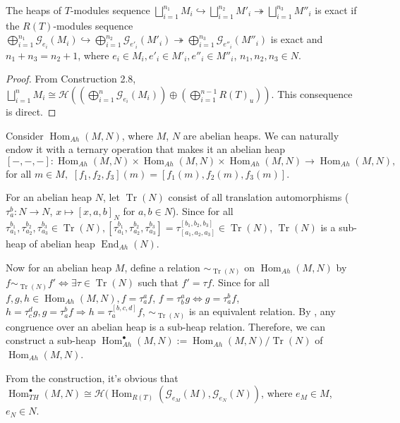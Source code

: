 \documentclass[11pt, twoside]{article}
\begin{document}
\begin{proposition}
The heaps of $T$-modules sequence $\bigsqcup_{i=1}^{n_1}M_i\hookrightarrow \bigsqcup_{i=1}^{n_2}M'_i \twoheadrightarrow \bigsqcup_{i=1}^{n_3}M''_i$ is exact if the $R(T)$-modules sequence $\bigoplus_{i=1}^{n_1}\mathcal{G}_{e_i}(M_i)\hookrightarrow \bigoplus_{i=1}^{n_2}\mathcal{G}_{e'_i}(M'_i) \twoheadrightarrow \bigoplus_{i=1}^{n_3}\mathcal{G}_{e''_i}(M''_i)$ is exact and $n_1 + n_3 = n_2+1$, where $e_i \in M_i, e'_i \in M'_i, e''_i \in M''_i$, $n_1, n_2, n_3\in N$.
\end{proposition}
\begin{proof}
From Construction 2.8, $\bigsqcup_{i=1}^{n}M_i \cong \mathcal{H}((\bigoplus_{i=1}^{n}\mathcal{G}_{e_i}(M_i))\oplus(\bigoplus_{i=1}^{n-1}R(T)_u))$. This consequence is direct.
\end{proof}

\begin{construction}
Consider $\operatorname{Hom}_{Ah}(M,N)$, where $M$, $N$ are abelian heaps. We can naturally endow it with a ternary operation that makes it an abelian heap\\
 $$[-,-,-]:\operatorname{Hom}_{Ah}(M,N)\times \operatorname{Hom}_{Ah}(M,N)\times \operatorname{Hom}_{Ah}(M,N)\rightarrow \operatorname{Hom}_{Ah}(M,N),$$
for all $m \in M,$ $[f_1,f_2,f_3](m)=[f_1(m),f_2(m),f_3(m)]$.

For an abelian heap $N$, let $\operatorname{Tr}(N)$ consist of all translation automorphisms ($\tau^b_a:N \rightarrow N$,   $x \mapsto [x,a,b]_N$ for $a,b\in N$). Since for all $\tau_{a_{1}}^{b_{1}},\tau_{a_{2}}^{b_{2}},\tau_{a_{3}}^{b_{3}} \in \operatorname{Tr}(N),[\tau_{a_{1}}^{b_{1}},\tau_{a_{2}}^{b_{2}},\tau_{a_{3}}^{b_{3}}] = \tau_{[a_{1},a_{2},a_{3}]}^{[b_{1},b_{2},b_{3}]} \in \operatorname{Tr}(N)$, $\operatorname{Tr}(N)$ is a sub-heap of abelian heap $\operatorname{End}_{Ah}(N)$.

Now for an abelian heap $M$, define a relation $\sim_{\operatorname{Tr}(N)}$ on $\operatorname{Hom}_{Ah}(M,N)$ by $f\sim_{\operatorname{Tr}(N)}f' \Leftrightarrow \exists \tau \in \operatorname{Tr}(N)$ such that $f'=\tau f$. Since for all $f,g,h\in \operatorname{Hom}_{Ah}(M,N), f=\tau^a_a f$, $f=\tau^a_b g\Leftrightarrow g=\tau^b_a f$, $h=\tau^d_c g,g=\tau^b_a f\Rightarrow h=\tau^{[b,c,d]}_a f$, $\sim_{\operatorname{Tr}(N)}$ is an equivalent relation. By \cite[Remark 2.1]{mb}, any congruence over an abelian heap is a sub-heap relation. Therefore, we can construct a sub-heap $\operatorname{Hom}^\bullet_{Ah}(M, N):= \operatorname{Hom}_{Ah}(M, N)/\operatorname{Tr}(N)$ of $\operatorname{Hom}_{Ah}(M, N)$.

From the construction, it's obvious that $\operatorname{Hom}^\bullet_{TH}(M, N)\cong \mathcal{H}(\operatorname{Hom}_{R(T)}(\mathcal{G}_{e_{M}}(M), \mathcal{G}_{e_N}(N))$, where $e_M\in M$, $e_N\in N$.
\end{construction}
\end{document}
